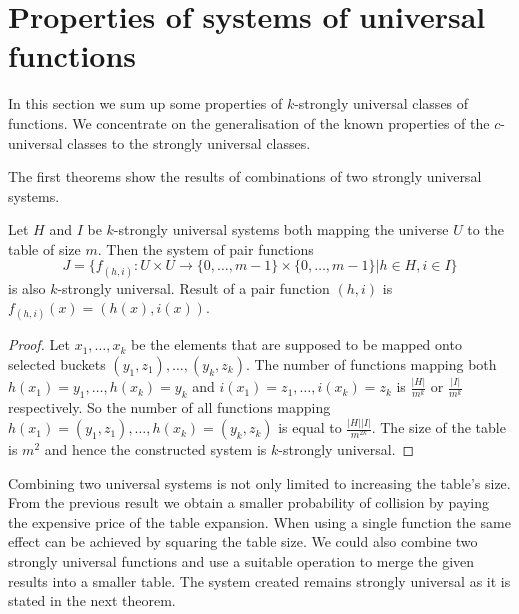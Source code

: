 

\section{Properties of systems of universal functions}
In this section we sum up some properties of $k$-strongly universal classes of functions. We concentrate on the generalisation of the known properties of the $c$-universal classes to the strongly universal classes.

The first theorems show the results of combinations of two strongly universal systems.
\begin{theorem}
Let $H$ and $I$ be $k$-strongly universal systems both mapping the universe $U$ to the table of size $m$. Then the system of pair functions 
\begin{displaymath}
J = \lbrace f_{(h, i)}:U \times U \rightarrow \lbrace 0, \dots, m - 1 \rbrace \times \lbrace 0, \dots, m - 1 \rbrace | h \in H, i \in I \rbrace
\end{displaymath} 
is also $k$-strongly universal. Result of a pair function $(h, i)$ is $f_{(h, i)}(x) = (h(x), i(x))$.
\end{theorem}
\begin{proof}
Let $x_1, \dots, x_k$ be the elements that are supposed to be mapped onto selected buckets $(y_1, z_1), \dots, (y_k, z_k)$. The number of functions mapping both $h(x_1) = y_1, \dots, h(x_k) = y_k$ and $i(x_1) = z_1, \dots, i(x_k) = z_k$ is $\frac{|H|}{m^k}$ or $\frac{|I|}{m^k}$ respectively. So the number of all functions mapping $h(x_1) = (y_1, z_1), \dots, h(x_k) = (y_k, z_k)$ is equal to $\frac{|H||I|}{m^{2k}}$. The size of the table is $m^2$ and hence the constructed system is $k$-strongly universal.
\end{proof}

Combining two universal systems is not only limited to increasing the table's size. From the previous result we obtain a smaller probability of collision by paying the expensive price of the table expansion. When using a single function the same effect can be achieved by squaring the table size.  We could also combine two strongly universal functions and use a suitable operation to merge the given results into a smaller table. The system created remains strongly universal as it is stated in the next theorem.

